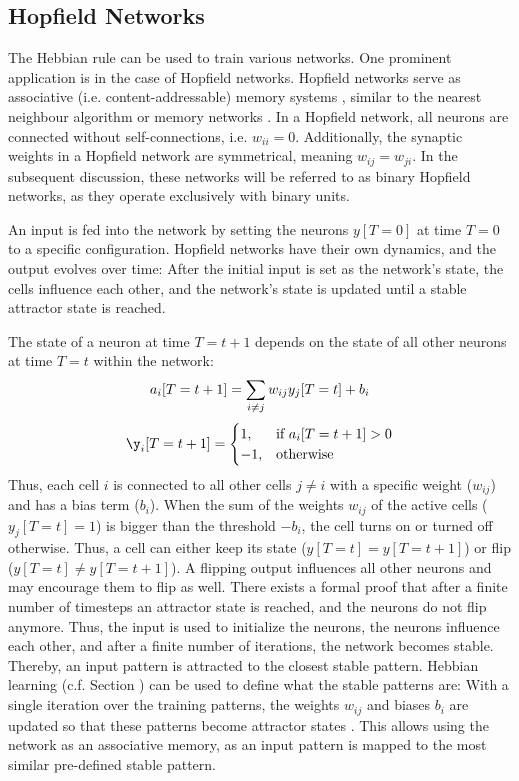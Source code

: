 \subsection{Hopfield Networks}
The Hebbian rule can be used to train various networks.
One prominent application is in the case of Hopfield networks.
Hopfield networks serve as associative (i.e. content-addressable) memory systems , similar to the nearest neighbour algorithm  or memory networks .
In a Hopfield network, all neurons are connected without self-connections, i.e. $w_{ii}=0$.
Additionally, the synaptic weights in a Hopfield network are symmetrical, meaning \(w_{ij} = w_{ji}\).
In the subsequent discussion, these networks will be referred to as binary Hopfield networks, as they operate exclusively with binary units.

An input is fed into the network by setting the neurons $y[T=0]$ at time $T=0$ to a specific configuration.
Hopfield networks have their own dynamics, and the output evolves over time: After the initial input is set as the network's state, the cells influence each other, and the network's state is updated until a stable attractor state is reached.

The state of a neuron at time $T=t+1$ depends on the state of all other neurons at time $T=t$ within the network:
%
\begin{align}\eqlbl{hf_1}
	a_i[T=t+1] = \sum_{i \neq j} w_{ij} y_j[T=t] + b_i
\end{align}
%
\begin{align}\eqlbl{hf_2}
	\y_i[T=t+1] = \begin{cases}
      		1, & \text{if } a_i[T=t+1] > 0 \\
      		-1, & \text{otherwise}
    	\end{cases}
\end{align}
%
Thus, each cell $i$ is connected to all other cells $j \neq i$ with a specific weight ($w_{ij}$) and has a bias term ($b_i$). 
When the sum of the weights $w_{ij}$ of the active cells ($y_j[T=t] = 1$) is bigger than the threshold $-b_i$, the cell turns on or turned off otherwise.
Thus, a cell can either keep its state ($y[T=t] = y[T=t+1]$) or flip ($y[T=t] \neq y[T=t+1]$).
A flipping output influences all other neurons and may encourage them to flip as well.
There exists a formal proof that after a finite number of timesteps an attractor state is reached, and the neurons do not flip anymore\cite{Hopfield_1982}.
Thus, the input is used to initialize the neurons, the neurons influence each other, and after a finite number of iterations, the network becomes stable. Thereby, an input pattern is attracted to the closest stable pattern.
Hebbian learning (c.f. Section ) can be used to define what the stable patterns are:
With a single iteration over the training patterns, the weights $w_{ij}$ and biases $b_i$ are updated so that these patterns become attractor states .
This allows using the network as an associative memory, as an input pattern is mapped to the most similar pre-defined stable pattern.

